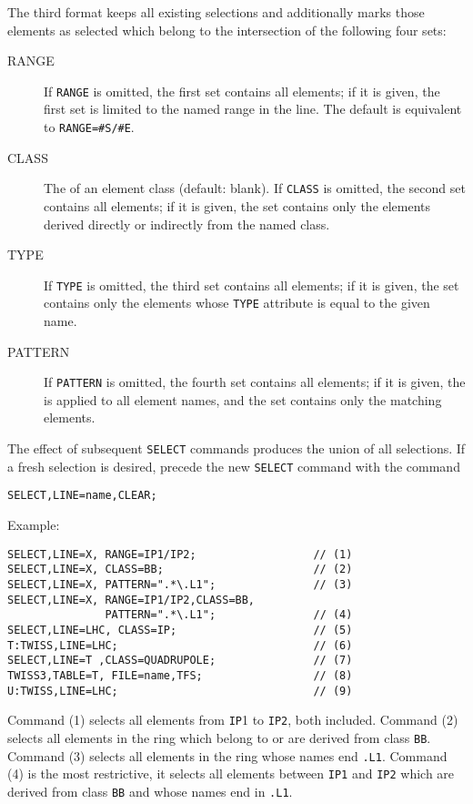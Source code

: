 The third format keeps all existing selections and additionally marks those
elements as selected which belong to the intersection of the following four
sets: 
\begin{description}
\item[RANGE]
  If \texttt{RANGE} is omitted, the first set contains all elements;
  if it is given, the first set is limited to the named range in the line. 
  The default is equivalent to \texttt{RANGE=\#S/\#E}.
\item[CLASS]
  The  of an element class (default: blank).
  If \texttt{CLASS} is omitted, the second set contains all elements;
  if it is given, the set contains only the elements derived directly or
  indirectly from the named class.
\item[TYPE]
  If \texttt{TYPE} is omitted, the third set contains all elements;
  if it is given, the set contains only the elements whose \texttt{TYPE}
  attribute is equal to the given name. 
\item[PATTERN]
  If \texttt{PATTERN} is omitted, the fourth set contains all elements;
  if it is given, the 
  is applied to all element names, and the set contains only the matching
  elements.
\end{description}
The effect of subsequent \texttt{SELECT} commands produces the union of all
selections. 
If a fresh selection is desired, precede the new \texttt{SELECT} command
with the command
\begin{verbatim}
SELECT,LINE=name,CLEAR;
\end{verbatim}
Example:
\begin{verbatim}
SELECT,LINE=X, RANGE=IP1/IP2;                  // (1)
SELECT,LINE=X, CLASS=BB;                       // (2)
SELECT,LINE=X, PATTERN=".*\.L1";               // (3)
SELECT,LINE=X, RANGE=IP1/IP2,CLASS=BB, 
               PATTERN=".*\.L1";               // (4)
SELECT,LINE=LHC, CLASS=IP;                     // (5)
T:TWISS,LINE=LHC;                              // (6)
SELECT,LINE=T ,CLASS=QUADRUPOLE;               // (7)
TWISS3,TABLE=T, FILE=name,TFS;                 // (8)
U:TWISS,LINE=LHC;                              // (9)
\end{verbatim}
Command (1) selects all elements from \texttt{IP}1 to \texttt{IP2}, 
both included.
Command (2) selects all elements in the ring which belong to or are 
derived from class \texttt{BB}.
Command (3) selects all elements in the ring whose names end \texttt{.L1}.
Command (4) is the most restrictive, it selects all elements
between \texttt{IP1} and \texttt{IP2} which are derived from class 
\texttt{BB} and whose names end in \texttt{.L1}.

